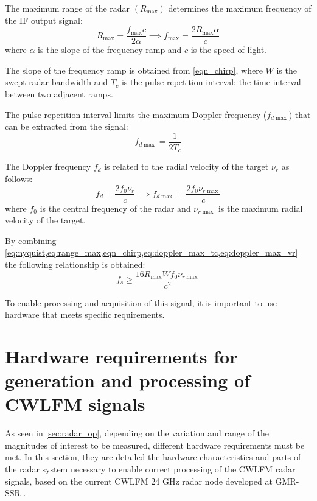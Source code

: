The maximum range of the radar $(R_{\max})$ determines the maximum frequency of the IF output signal:
\begin{equation}\label{eq:range_max}
	R_{\max} = \frac{f_{\max} c}{2 \alpha} \implies f_{\max} = \frac{2R_{\max} \alpha}{c}
\end{equation}
where $\alpha$ is the slope of the frequency ramp and $c$ is the speed of light.

The slope of the frequency ramp is obtained from \cref{eqn_chirp}, where $W$ is the swept radar bandwidth and $T_c$ is the pulse repetition interval: the time interval between two adjacent ramps.

The pulse repetition interval limits the maximum Doppler frequency ($f_{d\max}$) that can be extracted from the signal:
\begin{equation} \label{eq:doppler_max_tc}
	f_{d\max} = \frac{1}{2 T_c}
\end{equation}

The Doppler frequency $f_d$ is related to the radial velocity of the target $\nu_r$ as follows:
\begin{equation} \label{eq:doppler_max_vr}
	f_d = \frac{2 f_0 \nu_r}{c} \implies f_{d\max} = \frac{2 f_0 \nu_{r\max}}{c}
\end{equation}
where $f_0$ is the central frequency of the radar and $\nu_{r\max}$ is the maximum radial velocity of the target.

By combining \cref{eq:nyquist,eq:range_max,eqn_chirp,eq:doppler_max_tc,eq:doppler_max_vr} the following relationship is obtained:
\begin{equation} \label{eq:fs_final}
	f_s \ge \frac{16 R_{\max}W f_0 \nu_{r\max}}{c^2}
\end{equation}

To enable processing and acquisition of this signal, it is important to use hardware that meets specific requirements.

\section{Hardware requirements for generation and processing of CWLFM signals} \label{sec:general_hw_req}

As seen in \cref{sec:radar_op}, depending on the variation and range of the magnitudes of interest to be measured, different hardware requirements must be met. In this section, they are detailed the hardware characteristics and parts of the radar system necessary to enable correct processing of the CWLFM radar signals, based on the current CWLFM 24 GHz radar node developed at GMR-SSR \cite{Sardinero2022, Montesano2019}.

